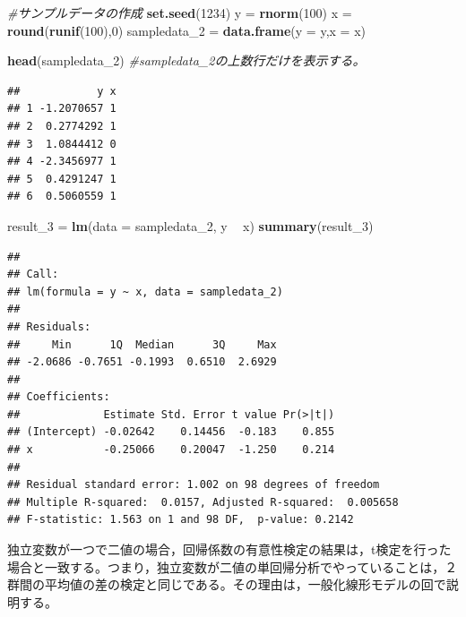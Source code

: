 \documentclass[]{article}
\newenvironment{Shaded}{\begin{snugshade}}{\end{snugshade}}
\newcommand{\KeywordTok}[1]{\textcolor[rgb]{0.13,0.29,0.53}{\textbf{#1}}}
\newcommand{\DataTypeTok}[1]{\textcolor[rgb]{0.13,0.29,0.53}{#1}}
\newcommand{\DecValTok}[1]{\textcolor[rgb]{0.00,0.00,0.81}{#1}}
\newcommand{\StringTok}[1]{\textcolor[rgb]{0.31,0.60,0.02}{#1}}
\newcommand{\CommentTok}[1]{\textcolor[rgb]{0.56,0.35,0.01}{\textit{#1}}}
\newcommand{\OperatorTok}[1]{\textcolor[rgb]{0.81,0.36,0.00}{\textbf{#1}}}
\newcommand{\NormalTok}[1]{#1}
\begin{document}
\begin{Shaded}
\begin{Highlighting}[]
\CommentTok{#サンプルデータの作成}
\KeywordTok{set.seed}\NormalTok{(}\DecValTok{1234}\NormalTok{)}
\NormalTok{y =}\StringTok{ }\KeywordTok{rnorm}\NormalTok{(}\DecValTok{100}\NormalTok{)}
\NormalTok{x =}\StringTok{ }\KeywordTok{round}\NormalTok{(}\KeywordTok{runif}\NormalTok{(}\DecValTok{100}\NormalTok{),}\DecValTok{0}\NormalTok{)}
\NormalTok{sampledata_}\DecValTok{2}\NormalTok{ =}\StringTok{ }\KeywordTok{data.frame}\NormalTok{(}\DataTypeTok{y =}\NormalTok{ y,}\DataTypeTok{x =}\NormalTok{ x)}

\KeywordTok{head}\NormalTok{(sampledata_}\DecValTok{2}\NormalTok{) }\CommentTok{#sampledata_2の上数行だけを表示する。}
\end{Highlighting}
\end{Shaded}

\begin{verbatim}
##            y x
## 1 -1.2070657 1
## 2  0.2774292 1
## 3  1.0844412 0
## 4 -2.3456977 1
## 5  0.4291247 1
## 6  0.5060559 1
\end{verbatim}

\begin{Shaded}
\begin{Highlighting}[]
\NormalTok{result_}\DecValTok{3}\NormalTok{ =}\StringTok{ }\KeywordTok{lm}\NormalTok{(}\DataTypeTok{data =}\NormalTok{ sampledata_}\DecValTok{2}\NormalTok{, y }\OperatorTok{~}\StringTok{ }\NormalTok{x)}
\KeywordTok{summary}\NormalTok{(result_}\DecValTok{3}\NormalTok{)}
\end{Highlighting}
\end{Shaded}

\begin{verbatim}
## 
## Call:
## lm(formula = y ~ x, data = sampledata_2)
## 
## Residuals:
##     Min      1Q  Median      3Q     Max 
## -2.0686 -0.7651 -0.1993  0.6510  2.6929 
## 
## Coefficients:
##             Estimate Std. Error t value Pr(>|t|)
## (Intercept) -0.02642    0.14456  -0.183    0.855
## x           -0.25066    0.20047  -1.250    0.214
## 
## Residual standard error: 1.002 on 98 degrees of freedom
## Multiple R-squared:  0.0157, Adjusted R-squared:  0.005658 
## F-statistic: 1.563 on 1 and 98 DF,  p-value: 0.2142
\end{verbatim}

独立変数が一つで二値の場合，回帰係数の有意性検定の結果は，t検定を行った場合と一致する。つまり，独立変数が二値の単回帰分析でやっていることは，２群間の平均値の差の検定と同じである。その理由は，一般化線形モデルの回で説明する。
\end{document}
